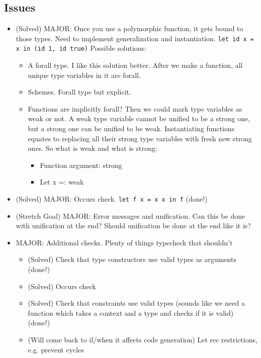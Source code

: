 \documentclass{report}
\newcommand{\camlinline}{\texttt}
\begin{document}
\subsection{Issues}
\begin{itemize}
	\item (Solved) MAJOR: Once you use a polymorphic function, it gets bound to those types. Need to implement generalization and instantiation. \camlinline{let id x = x in (id 1, id true)} Possible solutions:
	\begin{itemize}
		\item A forall type. I like this solution better. After we make a function, all unique type variables in it are forall.
		\item Schemes. Forall type but explicit.
		\item Functions are implicitly forall? Then we could mark type variables as weak or not. A weak type variable cannot be unified to be a strong one, but a strong one can be unified to be weak. Instantiating functions equates to replacing all their strong type variables with fresh new strong ones. So what is weak and what is strong:
		\begin{itemize}
			\item Function argument: strong
			\item Let x =: weak
		\end{itemize}
	\end{itemize}
    \item (Solved) MAJOR: Occurs check. \camlinline{let f x = x x in f} (done!)
    \item (Stretch Goal) MAJOR: Error messages and unification. Can this be done with unification at the end? Should unification be done at the end like it is?
    \item MAJOR: Additional checks. Plenty of things typecheck that shouldn't
    \begin{itemize}
    	\item (Solved) Check that type constructors use valid types as arguments (done!)
    	\item (Solved) Occurs check
    	\item (Solved) Check that constraints use valid types (sounds like we need a function which takes a context and a type and checks if it is valid) (done!)
    	\item (Will come back to if/when it affects code generation) Let rec restrictions, e.g. prevent cycles
    \end{itemize}
\end{itemize}
\end{document}
